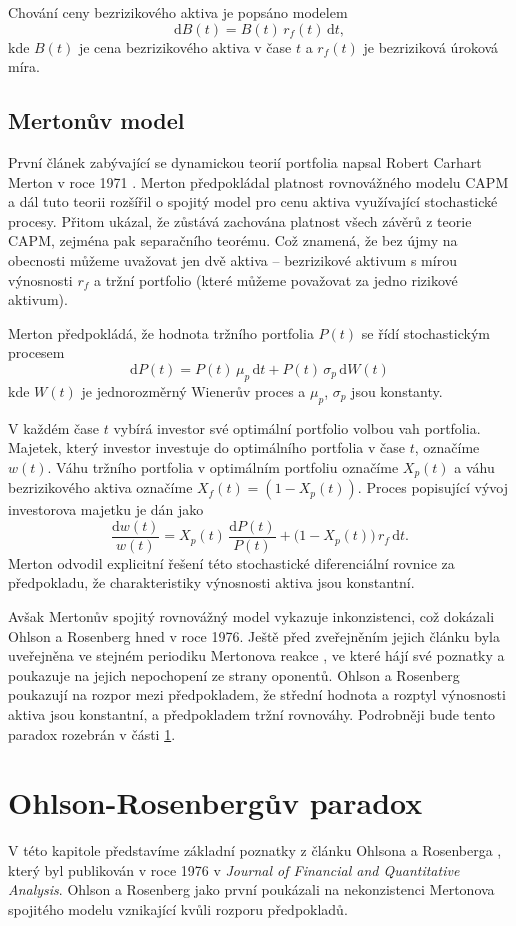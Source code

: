 \documentclass[a4paper,12pt]{report}
\theoremstyle{definition} \newtheorem{definice}[veta]{Definice}
\theoremstyle{remark}
\begin{document}
Chování ceny bezrizikového aktiva je popsáno modelem
$$\mathrm{d}B(t)=B(t)\,r_f(t)\,\mathrm{d}t,$$
kde $B(t)$ je cena bezrizikového aktiva v čase $t$ a $r_f(t)$ je bezriziková úroková míra.


\subsection{Mertonův model}
První článek zabývající se dynamickou teorií portfolia napsal Robert Carhart Merton v roce 1971 \cite{merton1971}.
Merton předpokládal platnost rovnovážného modelu CAPM a dál tuto teorii rozšířil o spojitý model pro cenu aktiva využívající stochastické procesy.
Přitom ukázal, že zůstává zachována platnost všech závěrů z teorie CAPM, zejména pak separačního teorému.
Což znamená, že bez újmy na obecnosti můžeme uvažovat jen dvě aktiva -- bezrizikové aktivum s mírou výnosnosti $r_f$ a tržní portfolio (které můžeme považovat za jedno rizikové aktivum). 

Merton předpokládá, že hodnota tržního portfolia $P(t)$ se řídí stochastickým procesem
$$\mathrm{d}P(t)=P(t)\,\mu_p\,\mathrm{d}t+P(t)\,\sigma_p\,\mathrm{d}W(t)$$
kde $W(t)$ je jednorozměrný Wienerův proces a $\mu_p$, $\sigma_p$ jsou konstanty. 

V každém čase $t$ vybírá investor své optimální portfolio volbou vah portfolia.
Majetek, který investor investuje do optimálního portfolia v čase $t$, označíme $w(t)$.
Váhu tržního portfolia v optimálním portfoliu označíme $X_p(t)$ a váhu bezrizikového aktiva označíme $X_f(t)=(1-X_p(t))$. 
Proces popisující vývoj investorova majetku je dán jako
$$\frac{\mathrm{d}w(t)}{w(t)}=X_p(t)\,\frac{\mathrm{d}P(t)}{P(t)}+\big(1-X_p(t)\big)\,r_f\,\mathrm{d}t.$$
Merton odvodil explicitní řešení této stochastické diferenciální rovnice za předpokladu, že charakteristiky výnosnosti aktiva jsou konstantní.

Avšak Mertonův spojitý rovnovážný model vykazuje inkonzistenci, což dokázali Ohlson a Rosenberg \cite{ohlson} hned v roce 1976.
Ještě před zveřejněním jejich článku byla uveřejněna ve stejném periodiku Mertonova reakce \cite{merton1975}, ve které hájí své poznatky a poukazuje na jejich nepochopení ze strany oponentů.  
Ohlson a Rosenberg \cite {ohlson} poukazují na rozpor mezi předpokladem, že střední hodnota a rozptyl výnosnosti aktiva jsou konstantní, a předpokladem tržní rovnováhy.
Podrobněji bude tento paradox rozebrán v části \ref{paradox}.


\section{Ohlson-Rosenbergův paradox}\label{paradox}
V této kapitole představíme základní poznatky z článku Ohlsona a Rosenberga \cite{ohlson}, který byl publikován v roce 1976 v \textit{Journal of Financial and Quantitative Analysis}.
Ohlson a Rosenberg jako první poukázali na nekonzistenci Mertonova spojitého modelu \cite{merton1971} vznikající kvůli rozporu předpokladů.
\end{document}
